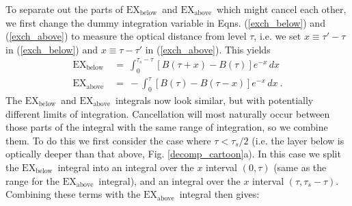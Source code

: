 \documentclass{ametsoc}
\newcommand{\n}{\nonumber}
\newcommand{\eqnref}[1]{(\ref{#1})}
\newcommand{\taus}{\ensuremath{\tau_s}}
\newcommand{\EXbelow}{\ensuremath{\mathrm{EX_{below}}}}
\newcommand{\EXabove}{\ensuremath{\mathrm{EX_{above}}}}
\begin{document}
To separate out the parts of \EXbelow\ and \EXabove\ which might cancel each other, we first change the dummy integration variable in  Eqns.  \eqnref{exch_below} and \eqnref{exch_above} to measure the optical distance from level $\tau$, i.e. we set
$x \equiv \tau'-\tau$ in \eqnref{exch_below} and $x \equiv \tau-\tau'$ in \eqnref{exch_above}. This yields
\begin{align}	
	\EXbelow &\  = \ \int_{0}^{\taus - \tau} [B(\tau+x)-B(\tau)]e^{-x} \, dx \n \\	
	\EXabove &\ = \ -\int_{0}^{ \tau} [B(\tau)-B(\tau-x)]e^{-x} \, dx 	\ . \n
\end{align}	
The \EXbelow\ and \EXabove\ integrals now look similar, but with potentially different limits of integration. Cancellation will most naturally occur between those parts of the integral with the same range of integration, so we combine them. To do this we first consider the case where $\tau < \taus/2$ (i.e.  the layer below is optically deeper than that above, Fig. \ref{decomp_cartoon}a). In this case we split the \EXbelow\ integral into an integral over the $x$ interval $(0,\tau)$ (same as the range for the \EXabove\ integral), and an integral over the $x$ interval $(\tau,\taus-\tau)$. Combining these terms with  the \EXabove\ integral  then gives:
\end{document}
